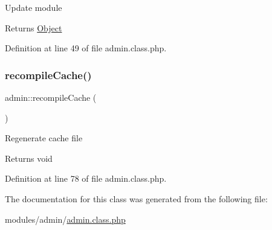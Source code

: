Update module \begin{DoxyReturn}{Returns}
\hyperlink{classObject}{Object} 
\end{DoxyReturn}


Definition at line 49 of file admin.\+class.\+php.

\mbox{\label{classadmin_a8392699186aca87dc8ce11546c2f715f}} 
\subsubsection{\texorpdfstring{recompile\+Cache()}{recompileCache()}}
{\footnotesize\ttfamily admin\+::recompile\+Cache (\begin{DoxyParamCaption}{ }\end{DoxyParamCaption})}

Regenerate cache file \begin{DoxyReturn}{Returns}
void 
\end{DoxyReturn}


Definition at line 78 of file admin.\+class.\+php.



The documentation for this class was generated from the following file\+:\begin{DoxyCompactItemize}
\item 
modules/admin/\hyperlink{admin_8class_8php}{admin.\+class.\+php}\end{DoxyCompactItemize}

